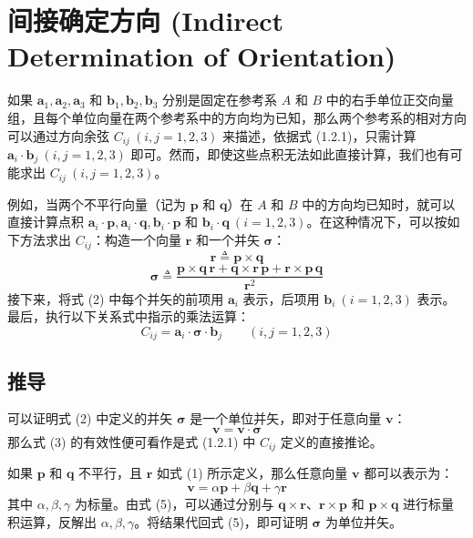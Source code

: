 \section{间接确定方向 (Indirect Determination of Orientation)}

如果 \(\mathbf{a}_1, \mathbf{a}_2, \mathbf{a}_3\) 和 \(\mathbf{b}_1, \mathbf{b}_2, \mathbf{b}_3\) 分别是固定在参考系 \(A\) 和 \(B\) 中的右手单位正交向量组，且每个单位向量在两个参考系中的方向均为已知，那么两个参考系的相对方向可以通过方向余弦 \(C_{ij} \ (i,j = 1,2,3)\) 来描述，依据式 (1.2.1)，只需计算 \(\mathbf{a}_i \cdot \mathbf{b}_j \ (i,j = 1,2,3)\) 即可。然而，即使这些点积无法如此直接计算，我们也有可能求出 \(C_{ij} \ (i,j = 1,2,3)\)。

例如，当两个不平行向量（记为 \(\mathbf{p}\) 和 \(\mathbf{q}\)）在 \(A\) 和 \(B\) 中的方向均已知时，就可以直接计算点积 \(\mathbf{a}_i \cdot \mathbf{p}, \mathbf{a}_i \cdot \mathbf{q}, \mathbf{b}_i \cdot \mathbf{p}\) 和 \(\mathbf{b}_i \cdot \mathbf{q} \ (i=1,2,3)\)。在这种情况下，可以按如下方法求出 \(C_{ij}\)：构造一个向量 \(\mathbf{r}\) 和一个并矢 \(\boldsymbol{\sigma}\)：
\begin{equation}
\mathbf{r} \triangleq \mathbf{p} \times \mathbf{q} \tag{1}
\end{equation}
\begin{equation}
\boldsymbol{\sigma} \triangleq \frac{\mathbf{p} \times \mathbf{q} \, \mathbf{r} + \mathbf{q} \times \mathbf{r} \, \mathbf{p} + \mathbf{r} \times \mathbf{p} \, \mathbf{q}}{\mathbf{r}^2} \tag{2}
\end{equation}
接下来，将式 (2) 中每个并矢的前项用 \(\mathbf{a}_i\) 表示，后项用 \(\mathbf{b}_i \ (i=1,2,3)\) 表示。最后，执行以下关系式中指示的乘法运算：
\begin{equation}
C_{ij} = \mathbf{a}_i \cdot \boldsymbol{\sigma} \cdot \mathbf{b}_j \qquad (i,j = 1,2,3) \tag{3}
\end{equation}

\subsection*{推导}
可以证明式 (2) 中定义的并矢 \(\boldsymbol{\sigma}\) 是一个单位并矢，即对于任意向量 \(\mathbf{v}\)：
\begin{equation}
\mathbf{v} = \mathbf{v} \cdot \boldsymbol{\sigma} \tag{4}
\end{equation}
那么式 (3) 的有效性便可看作是式 (1.2.1) 中 \(C_{ij}\) 定义的直接推论。

如果 \(\mathbf{p}\) 和 \(\mathbf{q}\) 不平行，且 \(\mathbf{r}\) 如式 (1) 所示定义，那么任意向量 \(\mathbf{v}\) 都可以表示为：
\begin{equation}
\mathbf{v} = \alpha \mathbf{p} + \beta \mathbf{q} + \gamma \mathbf{r} \tag{5}
\end{equation}
其中 \(\alpha, \beta, \gamma\) 为标量。由式 (5)，可以通过分别与 \(\mathbf{q} \times \mathbf{r}\)、\(\mathbf{r} \times \mathbf{p}\) 和 \(\mathbf{p} \times \mathbf{q}\) 进行标量积运算，反解出 \(\alpha, \beta, \gamma\)。将结果代回式 (5)，即可证明 \(\boldsymbol{\sigma}\) 为单位并矢。

